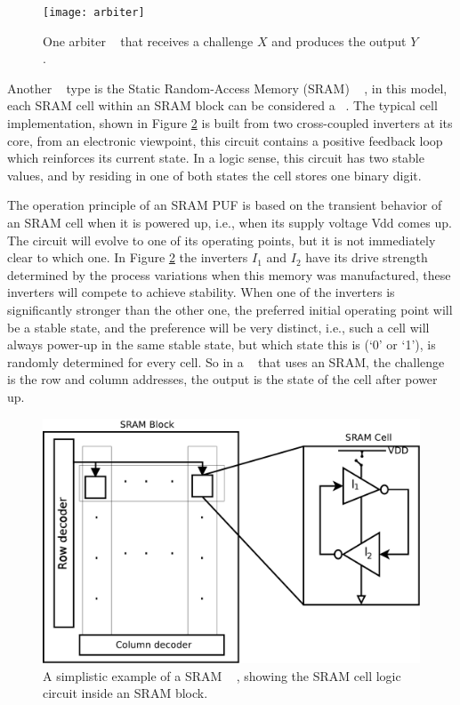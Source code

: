\begin{figure}[!ht]
	\centering
	\texttt{[image: arbiter]}
	\caption{One arbiter \puf~ that receives a challenge $X$ and produces the output $Y$.}
	\label{fig:arbiterpuf}
\end{figure}

Another \puf~ type is the Static Random-Access Memory (SRAM) \puf~ \cite{Leest2012}, in this model, each SRAM cell within an SRAM block can be considered a \puf~. The typical cell implementation, shown in Figure \ref{fig:spufexample} is built from two cross-coupled inverters at its core, from an electronic viewpoint, this circuit contains a positive feedback loop which reinforces its current state. In a logic sense, this circuit has two stable values, and by residing in one of both states the cell stores one binary digit.%

The operation principle of an SRAM PUF is based on the transient behavior of an SRAM cell when it is powered up, i.e., when its supply voltage Vdd comes up. The circuit will evolve to one of its operating points, but it is not immediately clear to which one. In Figure   \ref{fig:spufexample} the inverters $I_1$ and $I_2$ have its drive strength determined by the process variations when this memory was manufactured, these inverters will compete to achieve stability. When one of the inverters is significantly stronger than the other one, the preferred initial operating point will be a stable state, and the preference will be very distinct, i.e., such a cell will always power-up in the same stable state, but which state this is (‘0’ or ‘1’), is randomly determined for every cell.
So in a \puf~ that uses an SRAM, the challenge is the row and column addresses, the output is the state of the cell after power up.
\begin{figure}[!ht]
	\centering
	\includegraphics[scale=0.42]{figures/pdf/spuf}
	\caption{A simplistic example of a SRAM \puf~ , showing the SRAM cell logic circuit inside an SRAM block.}
	\label{fig:spufexample}
\end{figure}


